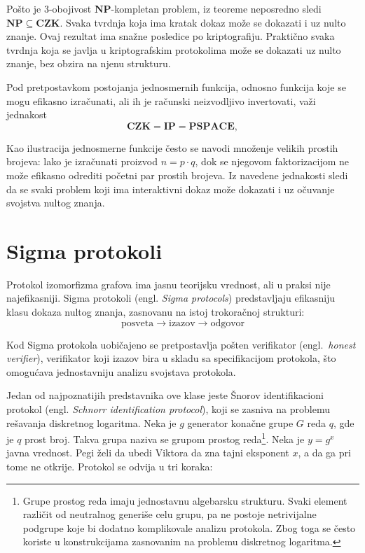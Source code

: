 Pošto je $3$-obojivost $\mathbf{NP}$-kompletan problem, iz teoreme 
neposredno sledi $\mathbf{NP} \subseteq \mathbf{CZK}$. Svaka tvrdnja 
koja ima kratak dokaz može se dokazati i uz nulto znanje. Ovaj rezultat 
ima snažne posledice po kriptografiju. Praktično svaka tvrdnja koja se 
javlja u kriptografskim protokolima može se dokazati uz nulto znanje, 
bez obzira na njenu strukturu.

Pod pretpostavkom postojanja jednosmernih funkcija, odnosno funkcija 
koje se mogu efikasno izračunati, ali ih je računski neizvodljivo invertovati, važi jednakost
\[
  \mathbf{CZK} = \mathbf{IP} = \mathbf{PSPACE},
\]

Kao ilustracija jednosmerne funkcije često se navodi množenje velikih prostih brojeva: 
lako je izračunati proizvod $n=p\cdot q$, dok se njegovom faktorizacijom ne može 
efikasno odrediti početni par prostih brojeva. Iz navedene jednakosti sledi 
da se svaki problem koji ima interaktivni dokaz može dokazati i uz 
očuvanje svojstva nultog znanja.

\section{Sigma protokoli}

Protokol izomorfizma grafova ima jasnu teorijsku vrednost, ali u praksi nije
najefikasniji. Sigma protokoli (engl. \textit{Sigma protocols}) predstavljaju efikasniju 
klasu dokaza nultog znanja, zasnovanu na istoj trokoračnoj strukturi:
\[
  \text{posveta} \longrightarrow \text{izazov} \longrightarrow \text{odgovor}
\]

Kod Sigma protokola uobičajeno se pretpostavlja pošten verifikator 
(engl.\ \textit{honest verifier}), verifikator koji izazov 
bira u skladu sa specifikacijom protokola, što omogućava jednostavniju 
analizu svojstava protokola.

Jedan od najpoznatijih predstavnika ove klase jeste Šnorov 
identifikacioni protokol (engl. \textit{Schnorr identification protocol}), 
koji se zasniva na problemu rešavanja diskretnog logaritma. 
Neka je $g$ generator konačne grupe $G$ reda $q$, gde je $q$ prost broj.
Takva grupa naziva se grupom prostog reda\footnote{Grupe prostog reda imaju 
jednostavnu algebarsku strukturu. Svaki element različit od neutralnog 
generiše celu grupu, pa ne postoje netrivijalne podgrupe koje bi dodatno 
komplikovale analizu protokola. Zbog toga se često koriste u konstrukcijama 
zasnovanim na problemu diskretnog logaritma.}.
Neka je $y = g^x$ javna vrednost. Pegi želi da ubedi Viktora 
da zna tajni eksponent $x$, a da ga pri tome ne otkrije. Protokol 
se odvija u tri koraka:

